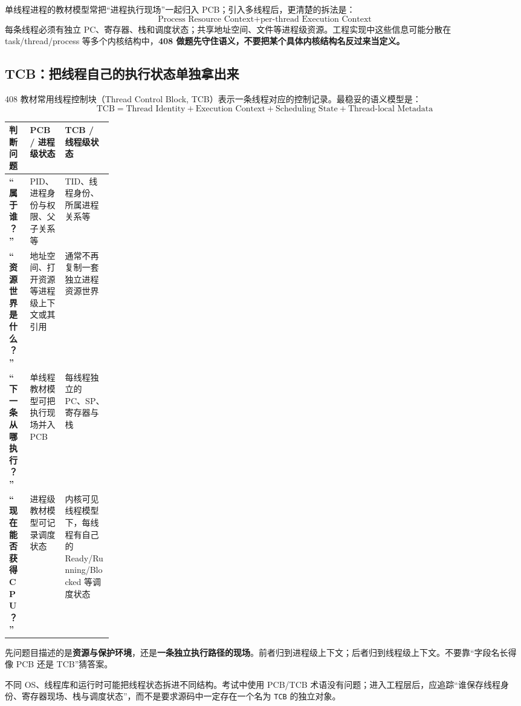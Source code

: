 \documentclass[11pt,a4paper]{ctexart}
\newcommand{\kw}[1]{\textbf{#1}}
\newcommand{\code}[1]{\texttt{#1}}
\begin{document}
单线程进程的教材模型常把“进程执行现场”一起归入 PCB；引入多线程后，更清楚的拆法是：
\[
\boxed{\text{Process Resource Context}+\text{per-thread Execution Context}}
\]
每条线程必须有独立 PC、寄存器、栈和调度状态；共享地址空间、文件等进程级资源。工程实现中这些信息可能分散在 task/thread/process 等多个内核结构中，\kw{408 做题先守住语义，不要把某个具体内核结构名反过来当定义。}

\subsection{TCB：把线程自己的执行状态单独拿出来}

408 教材常用线程控制块（Thread Control Block, TCB）表示一条线程对应的控制记录。最稳妥的语义模型是：
\[
\boxed{
\text{TCB}
=
\text{Thread Identity}
+
\text{Execution Context}
+
\text{Scheduling State}
+
\text{Thread-local Metadata}
}
\]

\begingroup
\small
\renewcommand{\arraystretch}{1.22}
\setlength{\tabcolsep}{5pt}
\begin{tabularx}{\linewidth}{>{\bfseries}p{0.20\linewidth} X X}
\toprule
判断问题 & PCB / 进程级状态 & TCB / 线程级状态\\
\midrule
“属于谁？” & PID、进程身份与权限、父子关系等 & TID、线程身份、所属进程关系等\\
“资源世界是什么？” & 地址空间、打开资源等进程级上下文或其引用 & 通常不再复制一套独立进程资源世界\\
“下一条从哪执行？” & 单线程教材模型可把执行现场并入 PCB & 每线程独立的 PC、SP、寄存器与栈\\
“现在能否获得 CPU？” & 进程级教材模型可记录调度状态 & 内核可见线程模型下，每线程有自己的 Ready/Running/Blocked 等调度状态\\
\bottomrule
\end{tabularx}
\endgroup

\begin{corebox}
先问题目描述的是\kw{资源与保护环境}，还是\kw{一条独立执行路径的现场}。前者归到进程级上下文；后者归到线程级上下文。不要靠“字段名长得像 PCB 还是 TCB”猜答案。
\end{corebox}

\begin{warn}
不同 OS、线程库和运行时可能把线程状态拆进不同结构。考试中使用 PCB/TCB 术语没有问题；进入工程层后，应追踪“谁保存线程身份、寄存器现场、栈与调度状态”，而不是要求源码中一定存在一个名为 \code{TCB} 的独立对象。
\end{warn}
\end{document}
